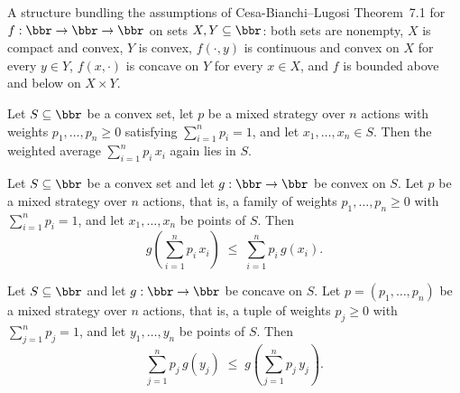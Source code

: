 \begin{definition}
\label{OnlineLearning.ConvexCompactMinimaxHypotheses}
\leanok
A structure bundling the assumptions of Cesa-Bianchi--Lugosi Theorem~7.1
for $f : \bbr \to \bbr \to \bbr$ on sets $X, Y \subseteq \bbr$: both sets
are nonempty, $X$ is compact and convex, $Y$ is convex, $f(\cdot,y)$ is
continuous and convex on $X$ for every $y \in Y$, $f(x,\cdot)$ is concave on
$Y$ for every $x \in X$, and $f$ is bounded above and below on $X \times Y$.
\end{definition}

\begin{lemma}
\label{OnlineLearning.mixed_sum_mem_convex}
\leanok
{}
Let $S \subseteq \bbr$ be a convex set, let $p$ be a mixed strategy over $n$ actions
with weights $p_1, \dots, p_n \ge 0$ satisfying $\sum_{i=1}^{n} p_i = 1$, and let $x_1,
\dots, x_n \in S$. Then the weighted average $\sum_{i=1}^{n} p_i\, x_i$ again lies in
$S$.
\end{lemma}

\begin{lemma}
\label{OnlineLearning.convexOn_mixed_sum_le}
\leanok
{}
Let $S \subseteq \bbr$ be a convex set and let $g : \bbr \to \bbr$ be convex on $S$. Let
$p$ be a mixed strategy over $n$ actions, that is, a family of weights $p_1, \dots, p_n
\ge 0$ with $\sum_{i=1}^{n} p_i = 1$, and let $x_1, \dots, x_n$ be points of $S$. Then
\[
  g\!\left(\sum_{i=1}^{n} p_i\, x_i\right)
  \;\le\;
  \sum_{i=1}^{n} p_i\, g(x_i).
\]
\end{lemma}

\begin{lemma}
\label{OnlineLearning.concaveOn_le_mixed_sum}
\leanok
{}
Let $S \subseteq \bbr$ and let $g : \bbr \to \bbr$ be concave on $S$. Let $p = (p_1,
\dots, p_n)$ be a mixed strategy over $n$ actions, that is, a tuple of weights $p_j \ge
0$ with $\sum_{j=1}^{n} p_j = 1$, and let $y_1, \dots, y_n$ be points of $S$. Then
\[
  \sum_{j=1}^{n} p_j\, g(y_j) \;\le\; g\!\left(\sum_{j=1}^{n} p_j\, y_j\right).
\]
\end{lemma}

